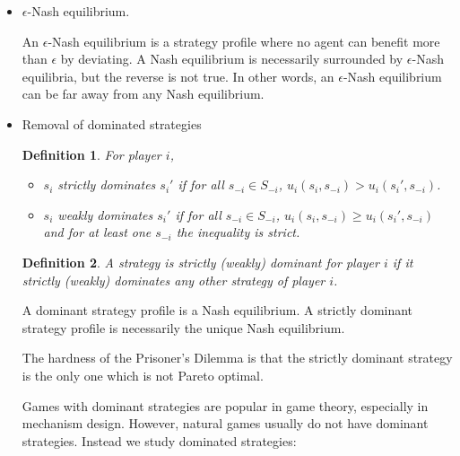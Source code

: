 \documentclass{article}
\newtheorem{definition}{Definition}
\newtheorem{theorem}{Theorem}
\begin{document}
\begin{itemize}
The existence of Nash equilibrium is guaranteed by the following theorem:
\begin{theorem}
Every game with a finite number of players and action profiles has at least one Nash equilibrium.
\end{theorem}
Even with this theorem, the computation of Nash equilibria is hard in general. However, if the support of the equilibrium strategy is known, the equilibrium can be computed by solving a set of linear equations.

\item $\epsilon$-Nash equilibrium.

An $\epsilon$-Nash equilibrium is a strategy profile where no agent can benefit more than $\epsilon$ by deviating. A Nash equilibrium is necessarily surrounded by $\epsilon$-Nash equilibria, but the reverse is not true. In other words, an $\epsilon$-Nash equilibrium can be far away from any Nash equilibrium.





\item Removal of dominated strategies

\begin{definition}
For player $i$,
\begin{itemize}
\item $s_i$ strictly dominates $s_{i}'$ if for all $s_{-i}\in S_{-i}$, $u_i(s_i,s_{-i})>u_i(s_{i}',s_{-i})$.
\item $s_i$ weakly dominates $s_{i}'$ if for all $s_{-i}\in S_{-i}$, $u_i(s_i,s_{-i})\ge u_i(s_{i}',s_{-i})$ and for at least one $s_{-i}$ the inequality is strict.
\end{itemize}
\end{definition}

\begin{definition}
A strategy is strictly (weakly) dominant for player $i$ if it strictly (weakly) dominates any other strategy of player $i$.
\end{definition}

A dominant strategy profile is a Nash equilibrium. A strictly dominant strategy profile is necessarily the unique Nash equilibrium.

The hardness of the Prisoner's Dilemma is that the strictly dominant strategy is the only one which is not Pareto optimal.

Games with dominant strategies are popular in game theory, especially in mechanism design. However, natural games usually do not have dominant strategies. Instead we study dominated strategies:


\end{itemize}
\end{document}
